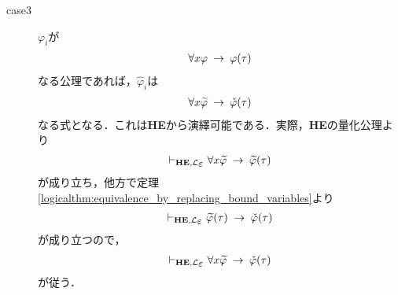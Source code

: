 \begin{metaprf}
\begin{description}
			\item[case3] $\varphi_{i}$が
				\begin{align}
					\forall x \varphi \hspace{0.25em}\rightarrow\hspace{0.25em} \varphi(\tau)
				\end{align}
				なる公理であれば，$\widehat{\varphi}_{i}$は
				\begin{align}
					\forall x \widetilde{\varphi} \hspace{0.25em}\rightarrow\hspace{0.25em} \check{\varphi}(\tau)
				\end{align}
				なる式となる．これは{\bf HE}から演繹可能である．実際，{\bf HE}の量化公理より
				\begin{align}
					\provable{\mbox{{\bf HE}},\lang{\varepsilon}} \forall x \widetilde{\varphi} \rarrow \widetilde{\varphi}(\tau)
				\end{align}
				が成り立ち，他方で定理\ref{logicalthm:equivalence_by_replacing_bound_variables}より
				\begin{align}
					\provable{\mbox{{\bf HE}},\lang{\varepsilon}} \widetilde{\varphi}(\tau) \rarrow \check{\varphi}(\tau)
				\end{align}
				が成り立つので，
				\begin{align}
					\provable{\mbox{{\bf HE}},\lang{\varepsilon}} \forall x \widetilde{\varphi} \rarrow \check{\varphi}(\tau)
				\end{align}
				が従う．
				

\end{description}
\end{metaprf}
